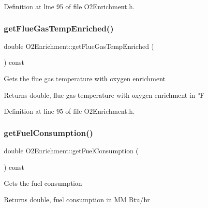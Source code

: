 Definition at line 95 of file O2\+Enrichment.\+h.

\mbox{\label{class_o2_enrichment_ab69ee84a1b662e4c1f9a49d23acc6f00}} 
\subsubsection{\texorpdfstring{get\+Flue\+Gas\+Temp\+Enriched()}{getFlueGasTempEnriched()}\hspace{0.1cm}{\footnotesize\ttfamily [3/3]}}
{\footnotesize\ttfamily double O2\+Enrichment\+::get\+Flue\+Gas\+Temp\+Enriched (\begin{DoxyParamCaption}{ }\end{DoxyParamCaption}) const\hspace{0.3cm}{\ttfamily [inline]}}

Gets the flue gas temperature with oxygen enrichment \begin{DoxyReturn}{Returns}
double, flue gas temperature with oxygen enrichment in °F 
\end{DoxyReturn}


Definition at line 95 of file O2\+Enrichment.\+h.

\mbox{\label{class_o2_enrichment_a48d73aca893ac689880b1d10faa399a5}} 
\subsubsection{\texorpdfstring{get\+Fuel\+Consumption()}{getFuelConsumption()}\hspace{0.1cm}{\footnotesize\ttfamily [1/3]}}
{\footnotesize\ttfamily double O2\+Enrichment\+::get\+Fuel\+Consumption (\begin{DoxyParamCaption}{ }\end{DoxyParamCaption}) const\hspace{0.3cm}{\ttfamily [inline]}}

Gets the fuel consumption \begin{DoxyReturn}{Returns}
double, fuel consumption in MM Btu/hr 
\end{DoxyReturn}



